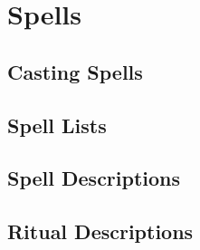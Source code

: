 \chapter{Spells}\label{Spells}

\section{Casting Spells}\label{Casting Spells} 

\section{Spell Lists}



\section{Spell Descriptions}



\section{Ritual Descriptions}


